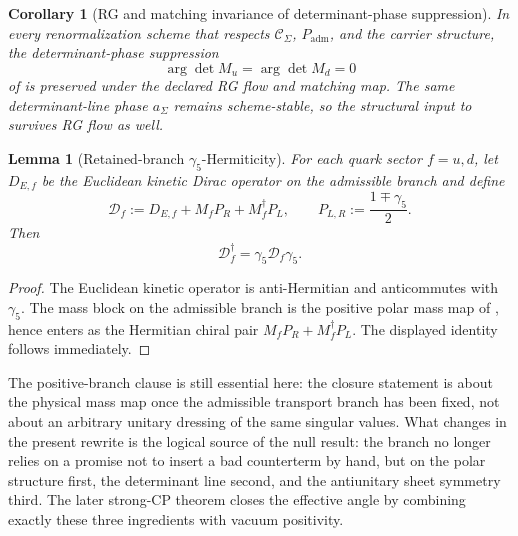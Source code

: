 \documentclass[11pt,a4paper]{article}
\newtheorem{corollary}[theorem]{Corollary}
\newtheorem{lemma}[theorem]{Lemma}
\theoremstyle{definition}
\theoremstyle{remark}
\newcommand{\Padm}{P_{\mathrm{adm}}}
\newcommand{\Cseam}{\mathcal C_{\Sigma}}
\begin{document}
\begin{corollary}[RG and matching invariance of determinant-phase suppression]
\label{cor:strong-cp-rg-stability}
In every renormalization scheme that respects $\Cseam$, $\Padm$, and the carrier structure, the
determinant-phase suppression
\[
\arg\det M_u=\arg\det M_d=0
\]
of  is preserved under the declared RG flow and matching map.
The same determinant-line phase $a_\Sigma$ remains scheme-stable, so the structural input to
 survives RG flow as well.
\end{corollary}

\begin{lemma}[Retained-branch \texorpdfstring{$\gamma_5$}{gamma5}-Hermiticity]
\label{lem:retained-gamma5-hermiticity}
For each quark sector $f=u,d$, let $D_{E,f}$ be the Euclidean kinetic Dirac operator on the
admissible branch and define
\[
\mathcal D_f:=D_{E,f}+M_fP_R+M_f^\dagger P_L,
\qquad
P_{L,R}:=\frac{1\mp\gamma_5}{2}.
\]
Then
\[
\mathcal D_f^\dagger=\gamma_5\mathcal D_f\gamma_5.
\]
\end{lemma}

\begin{proof}
The Euclidean kinetic operator is anti-Hermitian and anticommutes with $\gamma_5$. The mass block
on the admissible branch is the positive polar mass map of , hence
enters as the Hermitian chiral pair $M_fP_R+M_f^\dagger P_L$. The displayed identity follows
immediately.
\end{proof}

The positive-branch clause is still essential here: the closure statement is about the physical
mass map once the admissible transport branch has been fixed, not about an arbitrary unitary
dressing of the same singular values. What changes in the present rewrite is the logical source
of the null result: the branch no longer relies on a promise not to insert a bad counterterm by
hand, but on the polar structure first, the determinant line second, and the antiunitary sheet
symmetry third. The later strong-CP theorem closes the effective angle by combining exactly these
three ingredients with vacuum positivity.
\end{document}
